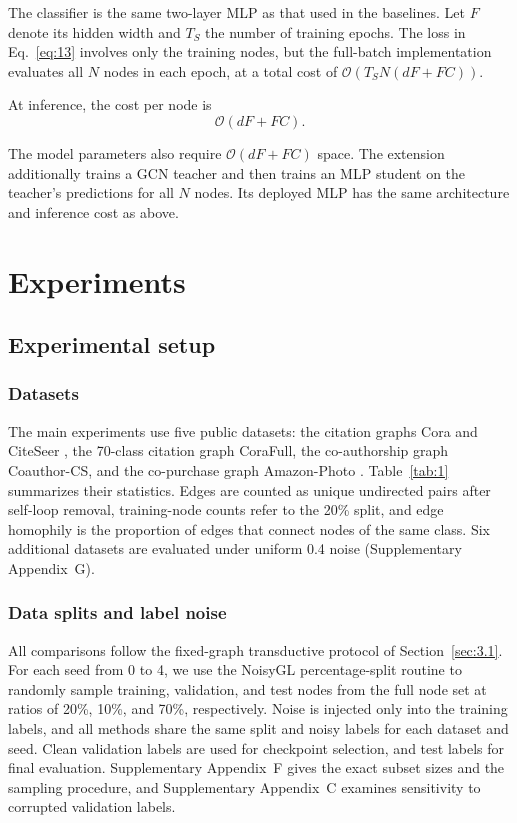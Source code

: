 \documentclass[times,review,10pt]{elsarticle}
\theoremstyle{definition}
\theoremstyle{plain}
\begin{document}
The classifier is the same two-layer MLP as that used in the baselines. Let \(F\) denote its hidden width and \(T_{S}\) the number of training epochs. The loss in Eq.~\eqref{eq:13} involves only the training nodes, but the full-batch implementation evaluates all \(N\) nodes in each epoch, at a total cost of \(\mathcal{O}(T_{S}N(dF + FC))\).\par
\noindent At inference, the cost per node is
\begin{equation}\label{eq:23}
\mathcal{O}(dF + FC).
\end{equation}

The model parameters also require \(\mathcal{O}(dF + FC)\) space. The extension additionally trains a GCN teacher and then trains an MLP student on the teacher's predictions for all \(N\) nodes. Its deployed MLP has the same architecture and inference cost as above.
\section{Experiments}\label{sec:4}

\subsection{Experimental setup}\label{sec:4.1}

\subsubsection{Datasets}\label{sec:4.1.1}

The main experiments use five public datasets: the citation graphs Cora and CiteSeer \cite{ref69}, the 70-class citation graph CoraFull, the co-authorship graph Coauthor-CS, and the co-purchase graph Amazon-Photo \cite{ref70}. Table~\ref{tab:1} summarizes their statistics. Edges are counted as unique undirected pairs after self-loop removal, training-node counts refer to the 20\% split, and edge homophily is the proportion of edges that connect nodes of the same class. Six additional datasets are evaluated under uniform 0.4 noise (Supplementary Appendix~G).



\subsubsection{Data splits and label noise}\label{sec:4.1.2}

All comparisons follow the fixed-graph transductive protocol of Section~\ref{sec:3.1}. For each seed from 0 to 4, we use the NoisyGL percentage-split routine to randomly sample training, validation, and test nodes from the full node set at ratios of 20\%, 10\%, and 70\%, respectively. Noise is injected only into the training labels, and all methods share the same split and noisy labels for each dataset and seed. Clean validation labels are used for checkpoint selection, and test labels for final evaluation. Supplementary Appendix~F gives the exact subset sizes and the sampling procedure, and Supplementary Appendix~C examines sensitivity to corrupted validation labels.
\end{document}
